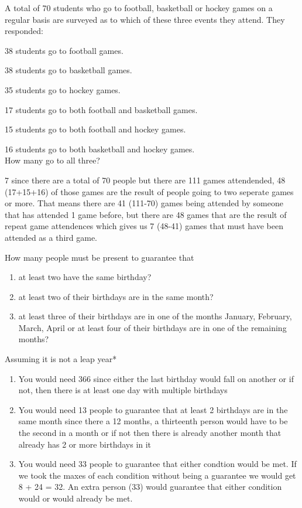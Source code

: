 \documentclass{homework}
\begin{document}
\question A total of 70 students who go to football, basketball or hockey games on a regular basis are surveyed as to which of these three events they attend. They responded:

38 students go to football games. \par
38 students go to basketball games. \par
35 students go to hockey games. \par
17 students go to both football and basketball games. \par
15 students go to both football and hockey games. \par
16 students go to both basketball and hockey games. \\

How many go to all three?

\begin{sol}
  7 since there are a total of 70 people but there are 111 games attendended, 48 (17+15+16) of those games are the result of people going to two seperate games or more. That means there are 41 (111-70) games being attended by someone that has attended 1 game before, but there are 48 games that are the result of repeat game attendences which gives us 7 (48-41) games that must have been attended as a third game. 
\end{sol}

\question How many people must be present to guarantee that
\begin{enumerate}[label=(\alph*)]
    \item at least two have the same birthday?
    \item at least two of their birthdays are in the same month?
    \item at least three of their birthdays are in one of the months January, February, March, April or at least four of their birthdays are in one of the remaining months?
\end{enumerate}

\begin{sol}
  Assuming it is not a leap year*
  \begin{enumerate}[label=(\alph*)]
    \item You would need 366 since either the last birthday would fall on another or if not, then there is at least one day with multiple birthdays
    \item You would need 13 people to guarantee that at least 2 birthdays are in the same month since there a 12 months, a thirteenth person would have to be the second in a month or if not then there is already another month that already has 2 or more birthdays in it 
    \item You would need 33 people to guarantee that either condtion would be met. If we took the maxes of each condition without being a guarantee we would get 8 + 24 = 32. An extra person (33) would guarantee that either condition would or would already be met.
  \end{enumerate}
\end{sol}
\end{document}
